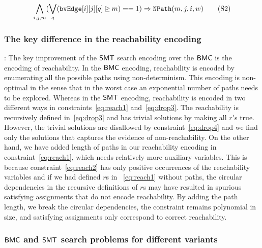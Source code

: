 \begin{align}
	\bigwedge\limits_{i,j,m} (\bigvee_{q} (\texttt{bvEdge}[i][j][q] \unrhd m) == 1) \Rightarrow \texttt{NPath}(m, j, i, w)
  \tag{S2}\label{eq:reachbmc2}
\end{align}


\subsubsection{The key difference in the reachability encoding}:
The key improvement of the $\mathsf{SMT}$ search encoding over the $\mathsf{BMC}$ is the
encoding of reachability.
%
In the $\mathsf{BMC}$ encoding, reachability is encoded by enumerating all the possible paths using non-determinism.
%
This encoding is non-optimal in the sense that in the worst case an exponential number of paths needs to be explored.
%
Whereas in the $\mathsf{SMT}$ encoding, reachability is encoded in two different
ways in constraints~\eqref{eq:reach1} and~\eqref{eq:drop3}.
%
The reachability is recursively defined in~\eqref{eq:drop3} and has
trivial solutions by making all $r'$s true.
%
However, the trivial solutions are disallowed by constraint~\eqref{eq:drop4} and we find
only the solutions that captures the evidence of non-reachability.
%
On the other hand, we have added length of paths in our reachability encoding in constraint~\eqref{eq:reach1}, which needs relatively more auxiliary variables.
%
This is because constraint~\eqref{eq:reach2} has only positive
occurrences of the reachability variables and if we had defined
$r$s in ~\eqref{eq:reach1} without paths,
the circular dependencies in the recursive definitions of $r$s
may have resulted in spurious satisfying assignments that
do not encode reachability.
%
By adding the path length, we break the circular dependencies, the
constraint remains polynomial in size, and satisfying assignments only
correspond to correct reachability.



\subsubsection{$\mathsf{BMC}$ and $\mathsf{SMT}$ search problems for different variants}

